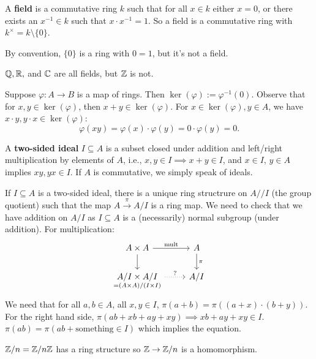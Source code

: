 \begin{definition}[]
    A \textbf{field} is a commutative ring $k$ such that for all $x \in k$ either $x=0$, or there exists an $x ^{-1} \in k$ such that $x \cdot  x ^{-1} =1$. So a field is a commutative ring with $k ^{\times }= k \setminus \{0\} $.
\end{definition}
By convention, $\{0\} $ is a ring with $0=1$, but it's not a field.
\begin{example}
    $\mathbb{Q}, \mathbb{R},$ and $\mathbb{C}$ are all fields, but $\mathbb{Z}$ is not.
\end{example}
Suppose $\varphi  \colon A \to B$ is a map of rings. Then $\ker (\varphi ):= \varphi ^{-1}(0)$. Observe that for $x,y \in \ker(\varphi )$, then $x+y \in \ker (\varphi )$. For $x \in \ker (\varphi ), y \in A$, we have $x \cdot y,y\cdot x \in \ker (\varphi )$: \[
    \varphi (xy)=\varphi (x)\cdot \varphi (y)=0 \cdot \varphi (y)=0.
\] 
\begin{definition}[]
    A \textbf{two-sided ideal} $I \subseteq A$ is a subset closed under addition and left/right multiplication by elements of $ A$, i.e., $x,y \in I \implies x+y \in I$, and $x \in I$, $y \in A$ implies $xy,yx \in I$. If $A$ is commutative, we simply speak of ideals.
\end{definition}
If $I \subseteq A$ is a two-sided ideal, there is a unique ring structrure on $A //I$ (the group quotient) such that the map $A \xrightarrow{\pi} A /I$ is a ring map. We need to check that we have addition on $A /I$ as $I \subseteq A$ is a (necessarily) normal subgroup (under addition). For multiplication:
\[
\begin{tikzcd}
    A \times A\arrow[r, "\text{mult} "]\arrow[d] & A \arrow[d, "\pi"]\\
    \underset{= (A \times  A)  / (I \times I)}{A / I \times  A / I}   \arrow[r, dotted, "?"] & A / I
\end{tikzcd}
\] We need that for all $a, b \in A$, all $x,y \in I$, $\pi(a+b)=\pi((a+x)\cdot (b+y))$. For the right hand side, $\pi(ab+xb+ay+xy) \implies  xb+ay+xy \in I$. $\pi(ab) = \pi(ab + \text{something} \in I)$ which implies the equation.

\begin{example}
    $\mathbb{Z} /n = \mathbb{Z} / n \mathbb{Z}$ has a ring structure so $\mathbb{Z} \to \mathbb{Z} /n$ is a homomorphism.
\end{example}
